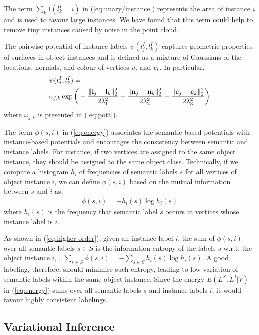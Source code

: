 \documentclass[10pt,twocolumn,letterpaper]{article}
\begin{document}
The term $\sum_{k} 1(l^I_k=i)$ in (\ref{eq:unary/instance}) represents the area
of instance $i$ and is used to favour large instances. We have found that this
term could help to remove tiny instances caused by noise in the point cloud.

The pairwise potential of instance labels $\psi(l^I_j, l^I_k)$ captures
geometric properties of surfaces in object instances and is defined as a mixture
of Gaussians of the locations, normals, and colour of vertices $v_j$ and
$v_k$. In particular,
\begin{align}
  \label{eq:pairwise/instance}
  &\psi(l^I_j, l^I_k) = \notag \\
  &\omega_{j,k} \exp \bigg( -\frac{\|\mathbf{l}_j-\mathbf{l}_k\|^2_2}{2\lambda_1^2} -\frac{\|\mathbf{n}_j-\mathbf{n}_k\|^2_2}{2\lambda_2^2} -\frac{\|\mathbf{c}_j-\mathbf{c}_k\|^2_2}{2\lambda_3^2} \bigg)
\end{align}
where $\omega_{j,k}$ is presented in (\ref{eq:pott}).

The term $\phi(s,i)$ in (\ref{eq:energy}) associates the semantic-based
potentials with instance-based potentials and encourages the consistency between
semantic and instance labels. For instance, if two vertices are assigned to the
same object instance, they should be assigned to the same object
class. Technically, if we compute a histogram $h_i$ of frequencies of semantic
labels $s$ for all vertices of object instance $i$, we can define $\phi(s,i)$
based on the mutual information between $s$ and $i$ as,
\begin{align}
  \label{eq:higher-order}
  \phi(s,i) = - h_i(s) \log h_i(s)
\end{align}
where $h_i(s)$ is the frequency that semantic label $s$ occurs in vertices whose
instance label is $i$.

As shown in (\ref{eq:higher-order}), given an instance label $i$, the sum of
$\phi(s,i)$ over all semantic labels $s \in S$ is the information entropy of the
labels $s$ w.r.t. the object instance $i$, \ie,
$\sum_{s \in S} \phi(s,i)=-\sum_{s \in S} h_i(s) \log h_i(s)$. A good labeling,
therefore, should minimise such entropy, leading to low variation of semantic
labels within the same object instance. Since the energy $E(L^S,L^I|V)$ in
(\ref{eq:energy}) sums over all semantic labels $s$ and instance labels $i$, it
would favour highly consistent labelings.

\subsection{Variational Inference}
\end{document}
